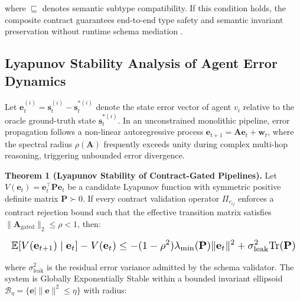 \documentclass[10pt,twocolumn,letterpaper]{article}
\begin{document}
where $\sqsubseteq$ denotes semantic subtype compatibility. If this condition holds, the composite contract guarantees end-to-end type safety and semantic invariant preservation without runtime schema mediation \cite{crossref_10_18653_v1_2026_findings_acl_1933}.


\subsection{Lyapunov Stability Analysis of Agent Error Dynamics}


Let $\mathbf{e}_t^{(i)} = \mathbf{s}_t^{(i)} - \mathbf{s}_t^{*(i)}$ denote the state error vector of agent $v_i$ relative to the oracle ground-truth state $\mathbf{s}_t^{*(i)}$. In an unconstrained monolithic pipeline, error propagation follows a non-linear autoregressive process $\mathbf{e}_{t+1} = \mathbf{A}\mathbf{e}_t + \mathbf{w}_t$, where the spectral radius $\rho(\mathbf{A})$ frequently exceeds unity during complex multi-hop reasoning, triggering unbounded error divergence.

\textbf{Theorem 1 (Lyapunov Stability of Contract-Gated Pipelines).} Let $V(\mathbf{e}_t) = \mathbf{e}_t^\top \mathbf{P} \mathbf{e}_t$ be a candidate Lyapunov function with symmetric positive definite matrix $\mathbf{P} \succ 0$. If every contract validation operator $\Pi_{c_{ij}}$ enforces a contract rejection bound such that the effective transition matrix satisfies $\|\mathbf{A}_{\text{gated}}\|_2 \le \rho < 1$, then:





\begin{equation}
\resizebox{\columnwidth}{!}{$\displaystyle
\begin{aligned}
\mathbb{E}[V(\mathbf{e}_{t+1}) \mid \mathbf{e}_t] - V(\mathbf{e}_t) \le -(1 - \rho^2) \lambda_{\min}(\mathbf{P}) \|\mathbf{e}_t\|^2 + \sigma_{\text{leak}}^2 \text{Tr}(\mathbf{P})
\end{aligned}
$}
\end{equation}





where $\sigma_{\text{leak}}^2$ is the residual error variance admitted by the schema validator. The system is Globally Exponentially Stable within a bounded invariant ellipsoid $\mathcal{B}_\eta = \{\mathbf{e} \mid \|\mathbf{e}\|^2 \le \eta\}$ with radius:
\end{document}
